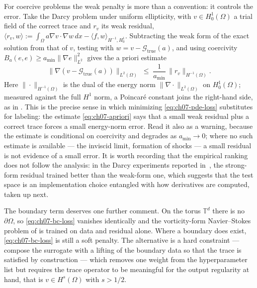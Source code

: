 For coercive problems the weak penalty is more than a convention: it controls the error. Take
the Darcy problem under uniform ellipticity, with $v\in H^1_0(\Omega)$ a trial field of the
correct trace and $r_v$ its weak residual,
$\langle r_v,w\rangle:=\int_\Omega a\nabla v\cdot\nabla w\,dx-\langle f,w\rangle_{H^{-1},H^1_0}$.
Subtracting the weak form of the exact solution from that of $v$, testing with
$w=v-\mathcal{G}_{\text{true}}(a)$, and using coercivity
$B_a(e,e)\ge a_{\min}\|\nabla e\|_{L^2}^2$ gives the a priori estimate
\begin{equation}
  \label{eq:ch07-apriori}
  \big\|\nabla(v-\mathcal{G}_{\text{true}}(a))\big\|_{L^2(\Omega)}
  \;\le\; \frac{1}{a_{\min}}\,\|r_v\|_{H^{-1}(\Omega)}.
\end{equation}
Here $\|\cdot\|_{H^{-1}(\Omega)}$ is the dual of the energy norm
$\|\nabla\cdot\|_{L^2(\Omega)}$ on $H^1_0(\Omega)$; measured against the full $H^1$ norm, a
Poincar{\'e} constant joins the right-hand side, as in
. This is the precise sense in
which minimizing \eqref{eq:ch07-pde-loss} substitutes for
labeling: the estimate \eqref{eq:ch07-apriori} says that a small weak residual plus a correct
trace forces a small energy-norm error. Read it
also as a warning, because the estimate is conditional on coercivity and degrades as
$a_{\min}\to0$; where no such estimate is available --- the inviscid limit, formation of
shocks --- a small residual is not evidence of a small error. It is worth recording that the
empirical ranking does not follow the analysis: in the Darcy experiments reported in~\cite{li2021physics},
the strong-form residual trained better than the weak-form one, which
suggests that the test space is an implementation choice entangled with how derivatives are
computed, taken up next.

The boundary term deserves one further comment. On the torus $\mathbb{T}^d$ there is no
$\partial\Omega$, so \eqref{eq:ch07-bc-loss} vanishes identically and the vorticity-form
Navier--Stokes problem of  is
trained on data and residual alone. Where a boundary does exist, \eqref{eq:ch07-bc-loss} is
still a soft penalty. The alternative is a hard constraint --- compose the surrogate with a
lifting of the boundary data so that the trace is satisfied by construction --- which removes
one weight from the hyperparameter list but requires the trace operator to be meaningful for
the output regularity at hand, that is $v\in H^{s}(\Omega)$ with $s>1/2$.

